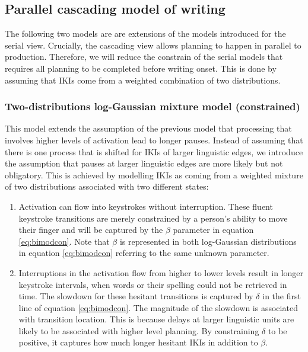 \documentclass[
  man,floatsintext]{apa7}
\begin{document}
\hypertarget{parallel-cascading-model-of-writing}{%
\subsection{Parallel cascading model of writing}\label{parallel-cascading-model-of-writing}}

The following two models are are extensions of the models introduced for the serial view. Crucially, the cascading view allows planning to happen in parallel to production. Therefore, we will reduce the constrain of the serial models that requires all planning to be completed before writing onset. This is done by assuming that IKIs come from a weighted combination of two distributions.

\hypertarget{two-distributions-log-gaussian-mixture-model-constrained}{%
\subsubsection{Two-distributions log-Gaussian mixture model (constrained)}\label{two-distributions-log-gaussian-mixture-model-constrained}}

This model extends the assumption of the previous model that processing that involves higher levels of activation lead to longer pauses. Instead of assuming that there is one process that is shifted for IKIs of larger linguistic edges, we introduce the assumption that pauses at larger linguistic edges are more likely but not obligatory. This is achieved by modelling IKIs as coming from a weighted mixture of two distributions associated with two different states:

\begin{enumerate}
\def\labelenumi{\arabic{enumi}.}
\item
  Activation can flow into keystrokes without interruption. These fluent keystroke transitions are merely constrained by a person's ability to move their finger and will be captured by the \(\beta\) parameter in equation \ref{eq:bimodcon}. Note that \(\beta\) is represented in both log-Gaussian distributions in equation \ref{eq:bimodcon} referring to the same unknown parameter.
\item
  Interruptions in the activation flow from higher to lower levels result in longer keystroke intervals, when words or their spelling could not be retrieved in time. The slowdown for these hesitant transitions is captured by \(\delta\) in the first line of equation \ref{eq:bimodcon}. The magnitude of the slowdown is associated with transition location. This is because delays at larger linguistic units are likely to be associated with higher level planning. By constraining \(\delta\) to be positive, it captures how much longer hesitant IKIs in addition to \(\beta\).
\end{enumerate}
\end{document}
